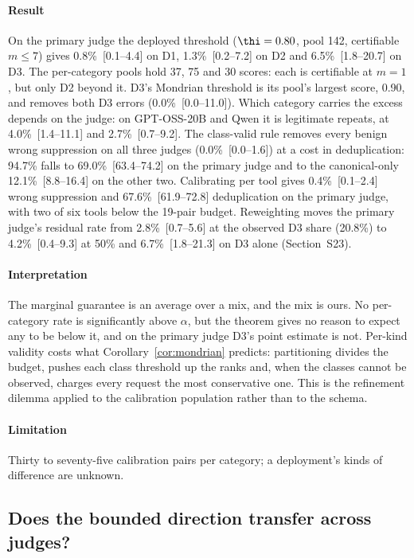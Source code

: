 \paragraph{Result} On the primary judge the deployed threshold ($\thi=0.80$, pool 142, certifiable $m\le7$) gives 0.8\%~[0.1--4.4] on D1, 1.3\%~[0.2--7.2] on D2 and 6.5\%~[1.8--20.7] on D3. The per-category pools hold 37, 75 and 30 scores: each is certifiable at $m=1$, but only D2 beyond it. D3's Mondrian threshold is its pool's largest score, 0.90, and removes both D3 errors (0.0\%~[0.0--11.0]). Which category carries the excess depends on the judge: on GPT-OSS-20B and Qwen it is legitimate repeats, at 4.0\%~[1.4--11.1] and 2.7\%~[0.7--9.2]. The class-valid rule removes every benign wrong suppression on all three judges (0.0\%~[0.0--1.6]) at a cost in deduplication: 94.7\% falls to 69.0\%~[63.4--74.2] on the primary judge and to the canonical-only 12.1\%~[8.8--16.4] on the other two. Calibrating per tool gives 0.4\%~[0.1--2.4] wrong suppression and 67.6\%~[61.9--72.8] deduplication on the primary judge, with two of six tools below the 19-pair budget. Reweighting moves the primary judge's residual rate from 2.8\%~[0.7--5.6] at the observed D3 share (20.8\%) to 4.2\%~[0.4--9.3] at 50\% and 6.7\%~[1.8--21.3] on D3 alone (Section~S23).

\paragraph{Interpretation} The marginal guarantee is an average over a mix, and the mix is ours. No per-category rate is significantly above $\alpha$, but the theorem gives no reason to expect any to be below it, and on the primary judge D3's point estimate is not. Per-kind validity costs what Corollary~\ref{cor:mondrian} predicts: partitioning divides the budget, pushes each class threshold up the ranks and, when the classes cannot be observed, charges every request the most conservative one. This is the refinement dilemma applied to the calibration population rather than to the schema.

\paragraph{Limitation} Thirty to seventy-five calibration pairs per category; a deployment's kinds of difference are unknown.

\subsection{Does the bounded direction transfer across judges?}\label{sec:res-judges}


